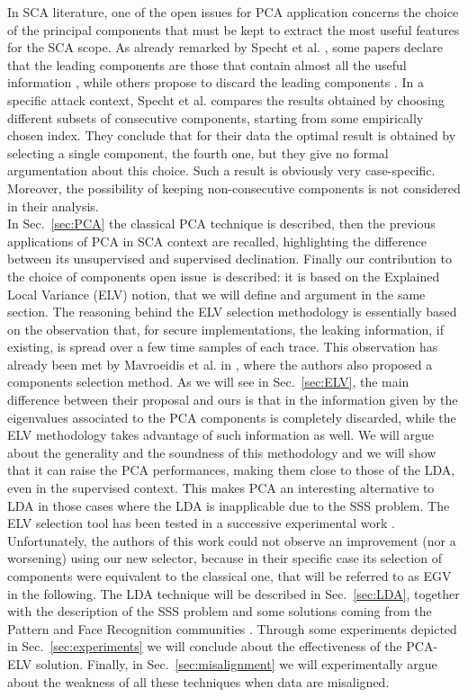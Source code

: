  In SCA literature, one of the open issues for PCA application concerns the choice of the principal components that must be kept to extract the most useful features for the SCA scope. As already remarked by Specht et al.  \cite{specht}, some papers declare that the leading components are those that contain almost all the useful information \cite{TAprincipal,choudary2014efficient}, while others propose to discard the leading components \cite{Batina2012}. In a specific attack context, Specht et al. compares the results obtained by choosing different subsets of consecutive components, starting from some empirically chosen index. They conclude that for their data the optimal result is obtained by selecting a single component, the fourth one, but they give no formal argumentation about this choice. Such a result is obviously very case-specific. Moreover, the possibility of keeping non-consecutive components is not considered in their analysis. \\

 
In Sec.~\ref{sec:PCA} the classical PCA technique is described, then the previous applications of PCA in SCA context are recalled, highlighting the difference between its unsupervised and supervised declination. Finally our contribution to  \textquotedbl the choice of components open issue\textquotedbl \  is described:  it is based on the Explained Local Variance (ELV) notion, that we will define and argument in the same section. The reasoning behind the ELV selection methodology is essentially based on the observation that, for secure implementations, the leaking information, if existing, is spread over a few time samples of each trace. This observation has already been met by Mavroeidis et al. in \cite{SCAclassProbl}, where the authors  also proposed a components selection method. As we will see in Sec.~\ref{sec:ELV}, the main difference between their proposal and ours is that in \cite{SCAclassProbl} the information given by the eigenvalues associated to the PCA components is completely discarded, while the ELV methodology takes advantage of such information as well.  We will argue about the generality and the soundness of this methodology and we will show that it can raise the PCA performances, making them close to those of the LDA, even in the supervised context. This makes PCA an interesting alternative to LDA in those cases where the LDA is inapplicable due to the SSS problem. The ELV selection tool has been tested in a successive experimental work \cite{choudary2018efficient}. Unfortunately, the authors of this work could not observe an improvement (nor a worsening) using our new selector, because in their specific case its selection of components were equivalent to the classical one, that will be referred to as EGV in the following. The LDA technique will be described in Sec.~\ref{sec:LDA}, together with the description of the SSS problem and some solutions coming from the Pattern and Face Recognition communities \cite{eigenfaces,Chen2000,Yu01adirect,huang}. Through some experiments depicted in Sec.~\ref{sec:experiments} we will conclude about the effectiveness of the PCA-ELV solution. Finally, in Sec.~\ref{sec:misalignment} we will experimentally argue about the weakness of all these techniques when data are misaligned.

